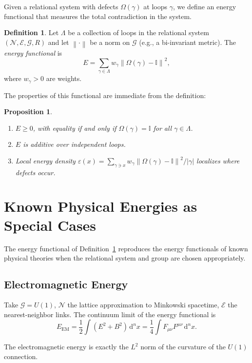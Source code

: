 \documentclass[12pt,a4paper,openany]{book}
\theoremstyle{plain}
\newtheorem{proposition}[theorem]{Proposition}
\theoremstyle{definition}
\newtheorem{definition}[theorem]{Definition}
\theoremstyle{remark}
\newcommand{\GG}{\mathcal{G}}
\newcommand{\NN}{\mathcal{N}}
\newcommand{\EE}{\mathcal{E}}
\newcommand{\id}{\mathbb{I}}
\newcommand{\defect}{\Omega}
\newcommand{\Energy}{E}
\newcommand{\norm}[1]{\left\|#1\right\|}
\newcommand{\dvol}{\,\mathrm{d}^n x}
\begin{document}
Given a relational system with defects $\defect(\gamma)$ at loops $\gamma$, we define an energy functional that measures the total contradiction in the system.

\begin{definition}
\label{def:energy}
Let $\Lambda$ be a collection of loops in the relational system $(\NN, \EE, \GG, R)$ and let $\norm{\cdot}$ be a norm on $\GG$ (e.g., a bi-invariant metric). The \emph{energy functional} is
\[
\Energy = \sum_{\gamma \in \Lambda} w_\gamma \norm{\defect(\gamma) - \id}^2,
\]
where $w_\gamma > 0$ are weights.
\end{definition}

The properties of this functional are immediate from the definition:

\begin{proposition}
\label{prop:energy_properties}
\begin{enumerate}
\item[\emph{(i)}] $\Energy \geq 0$, with equality if and only if $\defect(\gamma) = \id$ for all $\gamma \in \Lambda$.
\item[\emph{(ii)}] $\Energy$ is additive over independent loops.
\item[\emph{(iii)}] Local energy density $\varepsilon(x) = \sum_{\gamma \ni x} w_\gamma \norm{\defect(\gamma) - \id}^2 / |\gamma|$ localizes where defects occur.
\end{enumerate}
\end{proposition}

\section{Known Physical Energies as Special Cases}

The energy functional of Definition~\ref{def:energy} reproduces the energy functionals of known physical theories when the relational system and group are chosen appropriately.

\subsection{Electromagnetic Energy}

Take $\GG = U(1)$, $\NN$ the lattice approximation to Minkowski spacetime, $\EE$ the nearest-neighbor links. The continuum limit of the energy functional is
\[
\Energy_\text{EM} = \frac{1}{2} \int (E^2 + B^2) \dvol = \frac{1}{4} \int F_{\mu\nu} F^{\mu\nu} \dvol.
\]

The electromagnetic energy is exactly the $L^2$ norm of the curvature of the $U(1)$ connection.
\end{document}
